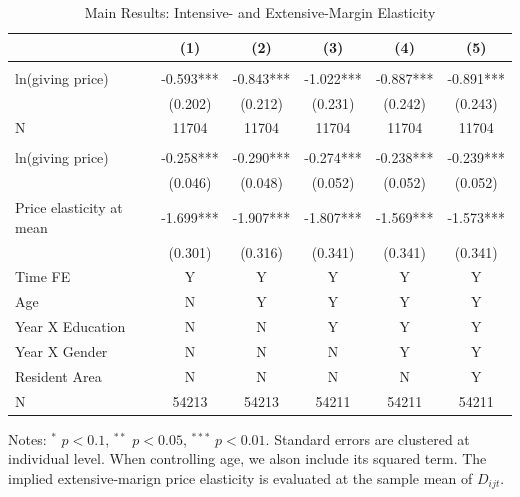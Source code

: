 \documentclass[ review  , 3p ]{elsarticle}
\begin{document}
  \begin{table}
  
  \caption{\label{tab:kableEstimateElasticityPart2}Main Results: Intensive- and Extensive-Margin Elasticity}
  \centering
  \begin{threeparttable}
  \begin{tabular}[t]{lccccc}
  \toprule
   & (1) & (2) & (3) & (4) & (5)\\
  \midrule
  \addlinespace[0.3em]
  \multicolumn{6}{l}{\textbf{Intensive-Margin Elasticity}}\\
  \hspace{1em}ln(giving price) & -0.593*** & -0.843*** & -1.022*** & -0.887*** & -0.891***\\
  \hspace{1em} & (0.202) & (0.212) & (0.231) & (0.242) & (0.243)\\
  \hspace{1em}N & 11704 & 11704 & 11704 & 11704 & 11704\\
  \addlinespace[0.3em]
  \multicolumn{6}{l}{\textbf{Extensive-Margin Elasticity}}\\
  \hspace{1em}ln(giving price) & -0.258*** & -0.290*** & -0.274*** & -0.238*** & -0.239***\\
  \hspace{1em} & (0.046) & (0.048) & (0.052) & (0.052) & (0.052)\\
  \hspace{1em}Price elasticity at mean & -1.699*** & -1.907*** & -1.807*** & -1.569*** & -1.573***\\
  \hspace{1em} & (0.301) & (0.316) & (0.341) & (0.341) & (0.341)\\
  \hspace{1em}Time FE & Y & Y & Y & Y & Y\\
  \hspace{1em}Age & N & Y & Y & Y & Y\\
  \hspace{1em}Year X Education & N & N & Y & Y & Y\\
  \hspace{1em}Year X Gender & N & N & N & Y & Y\\
  \hspace{1em}Resident Area & N & N & N & N & Y\\
  \hspace{1em}N & 54213 & 54213 & 54211 & 54211 & 54211\\
  \bottomrule
  \end{tabular}
  \begin{tablenotes}
  \item Notes: $^{*}$ $p < 0.1$, $^{**}$ $p < 0.05$, $^{***}$ $p < 0.01$. Standard errors are clustered at individual level. When controlling age, we alson include its squared term. The implied extensive-marign price elasticity is evaluated at the sample mean of $D_{ijt}$.
  \end{tablenotes}
  \end{threeparttable}
  \end{table}
  
\end{document}
